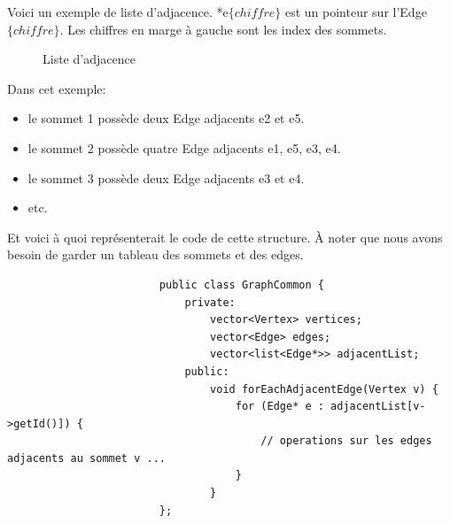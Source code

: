 \documentclass[french]{article}
\begin{document}
			Voici un exemple de liste d'adjacence. *e$\{chiffre\}$ est un pointeur sur l'Edge $\{chiffre\}$. Les chiffres en marge à gauche sont les index des sommets.
			\begin{figure}[H]
				\centering
				\caption{Liste d'adjacence}
			\end{figure}
			Dans cet exemple:
			\begin{itemize}
				\item le sommet 1 possède deux Edge adjacents e2 et e5.
				\item le sommet 2 possède quatre Edge adjacents e1, e5, e3, e4.
				\item le sommet 3 possède deux Edge adjacents e3 et e4.
				\item etc.
			\end{itemize}
			
			Et voici à quoi représenterait le code de cette structure. À noter que nous avons besoin de garder un tableau des sommets et des edges.
			\begin{lstlisting}
						public class GraphCommon {
							private:
								vector<Vertex> vertices;
								vector<Edge> edges;
								vector<list<Edge*>> adjacentList;
							public:
								void forEachAdjacentEdge(Vertex v) {
									for (Edge* e : adjacentList[v->getId()]) {
										// operations sur les edges adjacents au sommet v ...
									}
								}
						};
			\end{lstlisting}
			
\end{document}

